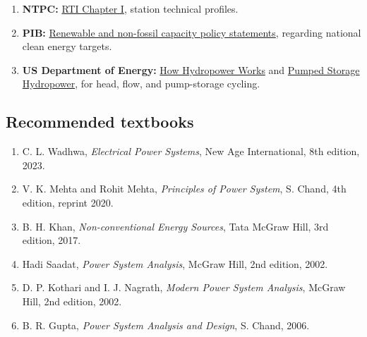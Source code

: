 \documentclass[11pt,a4paper]{article}
\begin{document}
\begin{enumerate}[label=\textbf{R\arabic*.},leftmargin=2.5em]
\item \textbf{NTPC:} \href{https://ntpc.co.in/index.php/rti/chapter-i}{RTI Chapter I}, station technical profiles.
\item \textbf{PIB:} \href{https://www.pib.gov.in/PressReleasePage.aspx?PRID=1944696&lang=2&reg=48}{Renewable and non-fossil capacity policy statements}, regarding national clean energy targets.
\item \textbf{US Department of Energy:} \href{https://www.energy.gov/cmei/water/how-hydropower-works}{How Hydropower Works} and \href{https://www.energy.gov/cmei/water/how-pumped-storage-hydropower-works}{Pumped Storage Hydropower}, for head, flow, and pump-storage cycling.
\end{enumerate}

\subsection{Recommended textbooks}
\begin{enumerate}
\item C. L. Wadhwa, \textit{Electrical Power Systems}, New Age International, 8th edition, 2023.
\item V. K. Mehta and Rohit Mehta, \textit{Principles of Power System}, S. Chand, 4th edition, reprint 2020.
\item B. H. Khan, \textit{Non-conventional Energy Sources}, Tata McGraw Hill, 3rd edition, 2017.
\item Hadi Saadat, \textit{Power System Analysis}, McGraw Hill, 2nd edition, 2002.
\item D. P. Kothari and I. J. Nagrath, \textit{Modern Power System Analysis}, McGraw Hill, 2nd edition, 2002.
\item B. R. Gupta, \textit{Power System Analysis and Design}, S. Chand, 2006.
\end{enumerate}
\end{document}
